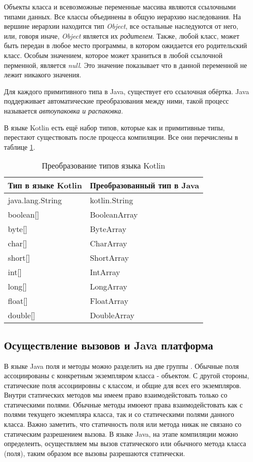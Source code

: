 Объекты класса и всевозможные переменные массива являются ссылочными типами данных. Все классы объединены в общую иерархию наследования. На вершине иерархии находится тип \textit{Object}, все остальные наследуются от него, или, говоря иначе, \textit{Object} является их \textit{родителем}. Также, любой класс, может быть передан в любое место программы, в котором ожидается его родительский класс.
Особым значением, которое может храниться в любой ссылочной перменной, является \textit{null}. Это значение показывает что в данной переменной не лежит никакого значения.

Для каждого примитивного типа в Java, существует его ссылочная обёртка. Java поддерживает автоматические преобразования между ними, такой процесс называется \textit{автоупаковка и распаковка}.

В языке Kotlin есть ещё набор типов, которые как и примитивные типы, перестают существовать после процесса компиляции. Все они перечислены в таблице \ref{tab:kotlinTypeConversion}.

\begin{table}[h]
\caption{\label{tab:kotlinTypeConversion}Преобразование типов языка Kotlin}
\begin{center}
\begin{tabular}{|l|l|}
\hline
Тип в языке Kotlin & Преобразованный тип в Java \\
\hline
java.lang.String & kotlin.String \\
boolean[]  & BooleanArray  \\
byte[]  & ByteArray \\
char[]  & CharArray \\
short[]  & ShortArray \\
int[] & IntArray \\
long[] &  LongArray \\
float[] & FloatArray \\
double[] & DoubleArray \\
\hline
\end{tabular}
\end{center}
\end{table}

\subsection{Осуществление вызовов и Java платформа}

В языке Java поля и методы можно разделить на две группы \cite{java:horstmann2012core}. Обычные поля ассоциированы с конкретным экземпляром класса - объектом. С другой стороны, статические поля ассоциировны с классом, и общие для всех его экземпляров. Внутри статических методов мы имеем право взаимодейстовать только со статическими полями. Обычные методы имюеют права взаимодейстовать как с полями текущего экземпляра класса, так и со статическими полями данного класса. Важно заметить, что статичность поля или метода никак не связано со статическим разрешением вызова. В языке Java, на этапе компиляции можно определеить, осуществляем мы вызов статического или обычного метода класса (поля), таким образом все вызовы разрешаются статически.

